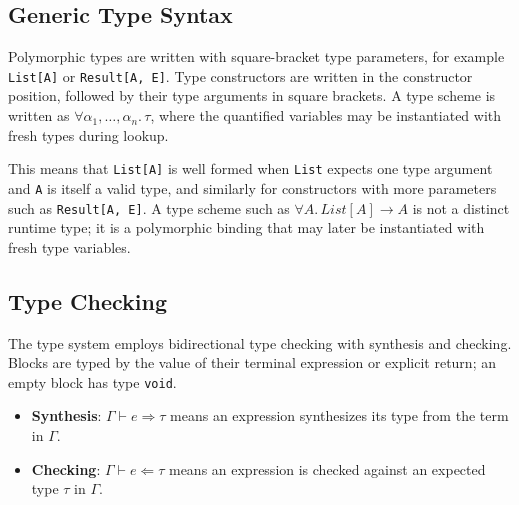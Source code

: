 \documentclass[11pt]{article}
\newcommand{\syn}{\Rightarrow} %
\newcommand{\chk}{\Leftarrow} %
\begin{document}
\subsection{Generic Type Syntax}
Polymorphic types are written with square-bracket type parameters, for example \texttt{List[A]} or \texttt{Result[A, E]}. Type constructors are written in the constructor position, followed by their type arguments in square brackets. A type scheme is written as $\forall \alpha_1, \ldots, \alpha_n.\,\tau$, where the quantified variables may be instantiated with fresh types during lookup.


This means that \texttt{List[A]} is well formed when \texttt{List} expects one type argument and \texttt{A} is itself a valid type, and similarly for constructors with more parameters such as \texttt{Result[A, E]}. A type scheme such as $\forall A.\,List[A] \to A$ is not a distinct runtime type; it is a polymorphic binding that may later be instantiated with fresh type variables.

\subsection{Type Checking}
The type system employs bidirectional type checking with synthesis and checking. Blocks are typed by the value of their terminal expression or explicit return; an empty block has type \texttt{void}.

\begin{itemize}
    \item \textbf{Synthesis}: $\Gamma \vdash e \syn \tau$ means an expression synthesizes its type from the term in $\Gamma$.
    \item \textbf{Checking}: $\Gamma \vdash e \chk \tau$ means an expression is checked against an expected type $\tau$ in $\Gamma$.
\end{itemize}
\end{document}
